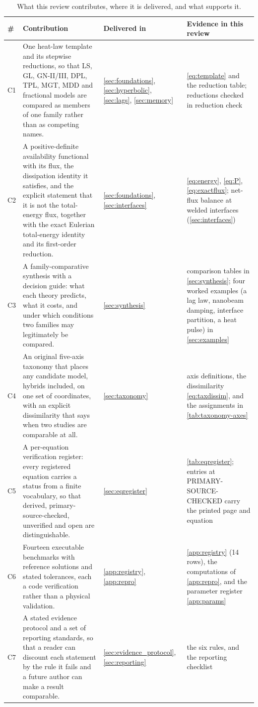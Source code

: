 \begin{table}[H]\centering\small
\caption{What this review contributes, where it is delivered, and what supports it.}
\label{tab:contributions}
\begin{tabularx}{\textwidth}{@{}p{0.5cm}Y p{2.5cm}Y@{}}
\toprule
\textbf{\#} & \textbf{Contribution} & \textbf{Delivered in} & \textbf{Evidence in this review} \\
\midrule
C1 & One heat-law template and its stepwise reductions, so that LS, GL, GN-II/III, DPL, TPL, MGT, MDD
  and fractional models are compared as members of one family rather than as competing names. &
  \cref{sec:foundations}, \cref{sec:hyperbolic}, \cref{sec:lags}, \cref{sec:memory} &
  \eqref{eq:template} and the reduction table; reductions checked in reduction check \\
C2 & A positive-definite availability functional with its flux, the dissipation identity it satisfies,
  and the explicit statement that it is not the total-energy flux, together with the exact Eulerian
  total-energy identity and its first-order reduction. & \cref{sec:foundations}, \cref{sec:interfaces} &
  \eqref{eq:energy}, \eqref{eq:P}, \eqref{eq:exactflux}; net-flux balance at welded interfaces (\cref{sec:interfaces}) \\
C3 & A family-comparative synthesis with a decision guide: what each theory predicts, what it costs, and
  under which conditions two families may legitimately be compared. & \cref{sec:synthesis} &
  comparison tables in \cref{sec:synthesis}; four worked examples (a lag law, nanobeam damping, interface partition, a heat pulse) in \cref{sec:examples} \\
C4 & An original five-axis taxonomy that places any candidate model, hybrids included, on one set of
  coordinates, with an explicit dissimilarity that says when two studies are comparable at all. &
  \cref{sec:taxonomy} & axis definitions, the dissimilarity \eqref{eq:taxdissim}, and the assignments in
  \cref{tab:taxonomy-axes} \\
C5 & A per-equation verification register: every registered equation carries a status from a finite
  vocabulary, so that derived, primary-source-checked, unverified and open are distinguishable. &
  \cref{sec:eqregister} & \cref{tab:eqregister}; entries at PRIMARY-SOURCE-CHECKED carry the printed page and equation \\
C6 & Fourteen executable benchmarks with reference solutions and stated tolerances, each a code
  verification rather than a physical validation. & \cref{app:registry}, \cref{app:repro} &
  \cref{app:registry} (14 rows), the computations of \cref{app:repro}, and the parameter register
  \cref{app:params} \\
C7 & A stated evidence protocol and a set of reporting standards, so that a reader can discount each
  statement by the rule it fails and a future author can make a result comparable. &
  \cref{sec:evidence_protocol}, \cref{sec:reporting} & the six rules, and the reporting checklist \\
\bottomrule
\end{tabularx}
\end{table}

